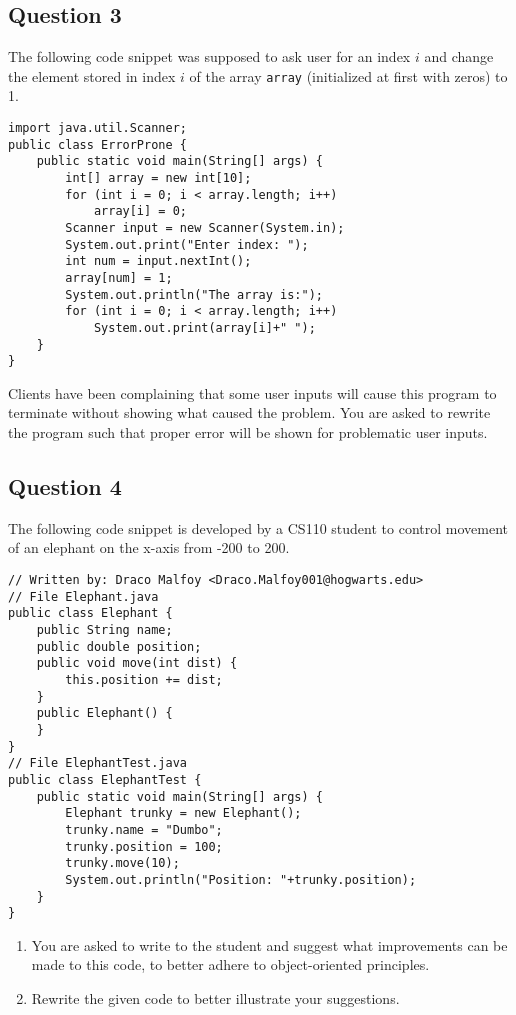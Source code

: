 \documentclass[12pt,letterpaper,twoside]{article}
\begin{document}
\subsection*{Question 3}

The following code snippet was supposed to ask user for an index $i$ and change the element stored in index $i$ of the array \texttt{array} (initialized at first with zeros) to 1.

\begin{lstlisting}
import java.util.Scanner;
public class ErrorProne {
	public static void main(String[] args) {
		int[] array = new int[10];
		for (int i = 0; i < array.length; i++)
			array[i] = 0;
		Scanner input = new Scanner(System.in);
		System.out.print("Enter index: ");
		int num = input.nextInt();
		array[num] = 1;
		System.out.println("The array is:");
		for (int i = 0; i < array.length; i++)
			System.out.print(array[i]+" ");
	}
}
\end{lstlisting}

Clients have been complaining that some user inputs will cause this program to terminate without showing what caused the problem. You are asked to rewrite the program such that proper error will be shown for problematic user inputs.
\newpage

\subsection*{Question 4}

The following code snippet is developed by a CS110 student to control movement of an elephant on the x-axis from -200 to 200.
\begin{lstlisting}
// Written by: Draco Malfoy <Draco.Malfoy001@hogwarts.edu>
// File Elephant.java
public class Elephant {
	public String name;
	public double position;
	public void move(int dist) {
		this.position += dist;
	}
	public Elephant() {
	}
}
// File ElephantTest.java
public class ElephantTest {
	public static void main(String[] args) {
		Elephant trunky = new Elephant();
		trunky.name = "Dumbo";
		trunky.position = 100;
		trunky.move(10);
		System.out.println("Position: "+trunky.position);
	}
}
\end{lstlisting}
\begin{enumerate}[label=(\alph*)]\itemsep=0pt
\item You are asked to write to the student and suggest what improvements can be made to this code, to better adhere to object-oriented principles.
\item Rewrite the given code to better illustrate your suggestions.
\end{enumerate}
\end{document}
